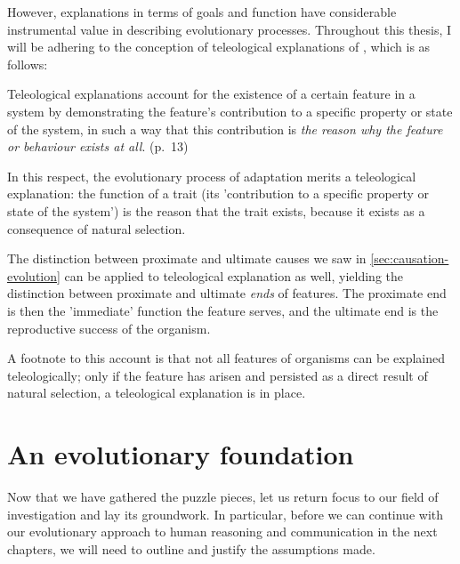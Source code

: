 However, explanations in terms of goals and function have considerable instrumental value in describing evolutionary processes. Throughout this thesis, I will be adhering to the conception of teleological explanations of \citet{Ayala99}, which is as follows:
\begin{quoting}
    Teleological explanations account for the existence of a certain feature in a system by demonstrating the feature’s contribution to a specific property or state of the system, in such a way that this contribution is \emph{the reason why the feature or behaviour exists at all}.
    \hfill (p.~13)
\end{quoting}
In this respect, the evolutionary process of adaptation merits a teleological explanation: the function of a trait (its 'contribution to a specific property or state of the system') is the reason that the trait exists, because it exists as a consequence of natural selection.

The distinction between proximate and ultimate causes we saw in \cref{sec:causation-evolution} can be applied to teleological explanation as well, yielding the distinction between proximate and ultimate \emph{ends} of features. The proximate end is then the 'immediate' function the feature serves, and the ultimate end is the reproductive success of the organism.

A footnote to this account is that not all features of organisms can be explained teleologically; only if the feature has arisen and persisted as a direct result of natural selection, a teleological explanation is in place.


\section{An evolutionary foundation}
\label{sec:evol-method}
Now that we have gathered the puzzle pieces, let us return focus to our field of investigation and lay its groundwork. In particular, before we can continue with our evolutionary approach to human reasoning and communication in the next chapters, we will need to outline and justify the assumptions made.

